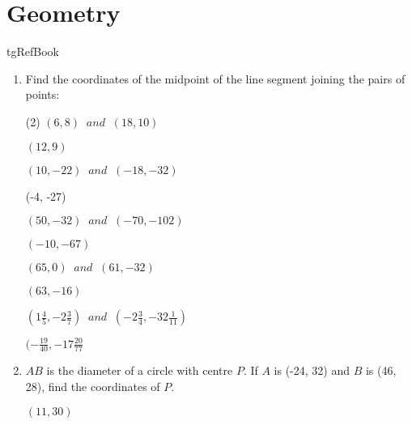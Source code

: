     

\chapter{Geometry}



\begin{taggedblock}{tgRefBook}
\end{taggedblock}

\begin{enumerate} [leftmargin=0cm] 



\clearpage

\item Find the coordinates of the midpoint of the line segment joining the pairs of points:
\begin{tasks}[label=(\arabic*), after-item-skip=2pt,after-skip=3pt, label-width=4ex](2)
    \task  $ (6, 8) \;\; and \;\;(18, 10) $  \\
        \begin{envAnswer} $ (12, 9) $ \end{envAnswer}
           
    \task  $ (10, -22) \;\; and \;\;(-18, -32) $  \\
        \begin{envAnswer}[blankline=3] (-4, -27) \end{envAnswer}

    \task  $ (50, -32) \;\; and \;\;(-70, -102) $  \\
        \begin{envAnswer}[blankline=3] $(-10, -67) $ \end{envAnswer}


    \task  $ (65, 0) \;\; and \;\;(61, -32) $  \\
        \begin{envAnswer}[blankline=3] $(63, -16) $ \end{envAnswer}


    \task  $ (1\frac{4}{5}, -2\frac{3}{7}) \;\; and \;\;(-2\frac{3}{4}, -32\frac{1}{11}) $  \\
        \begin{envAnswer}[blankline=3] $(-\frac{19}{40}, -17\frac{20}{77}  $ \end{envAnswer}

\end{tasks}




\item $AB$ is the diameter of a circle with centre $P$. If $A$ is (-24, 32) and $B$ is (46, 28), find the coordinates
of $P$. \\

        \begin{envAnswer}[blankline=3] $(11, 30) $ \end{envAnswer}

\clearpage

\end{enumerate} 
